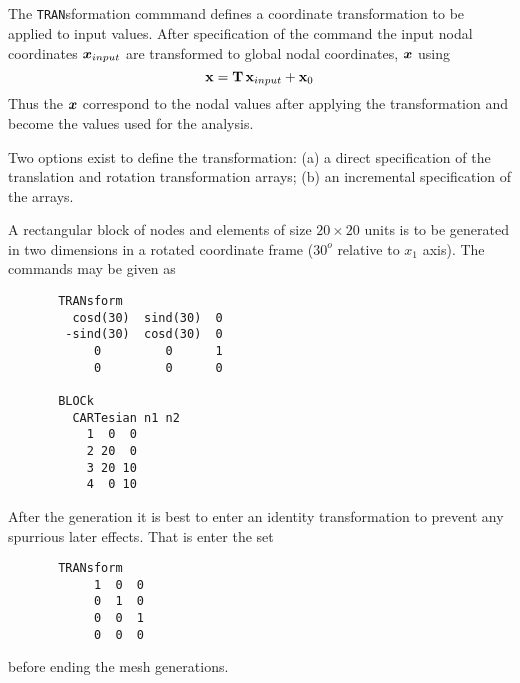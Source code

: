  \\{\smallskip}
 \\{\smallskip}
 \\{\smallskip}
 \\{\smallskip}
\headb

The {\tt TRAN}sformation commmand defines a coordinate transformation
to be applied to input values. After specification of the command
the input nodal coordinates $\boldsymbol{x}_{input}$ are transformed to global
nodal coordinates, $\boldsymbol{x}$ using
\begin{displaymath}
\mathbf{x} = \mathbf{T} \, \mathbf{x}_{input} + \mathbf{x}_0
\end{displaymath}
Thus the $\boldsymbol{x}$ correspond to the nodal values after applying
the transformation and become the values used for the analysis.

Two options exist to define the transformation: (a) a direct specification of
the translation and rotation transformation arrays; (b) an incremental
specification of the arrays. 


A rectangular block of nodes and elements of size $20 \times 20$ units
is to be generated in two dimensions
in a rotated coordinate frame ($30^o$ relative to $x_1$ axis).  The commands
may be given as
\begin{verbatim}
       TRANsform
         cosd(30)  sind(30)  0
        -sind(30)  cosd(30)  0
            0         0      1
            0         0      0

       BLOCk
         CARTesian n1 n2
           1  0  0
           2 20  0
           3 20 10
           4  0 10
\end{verbatim}
After the generation it is best to enter an identity transformation 
to prevent any spurrious later effects.  That is enter the set
\begin{verbatim}
       TRANsform
            1  0  0
            0  1  0
            0  0  1
            0  0  0
\end{verbatim}
before ending the mesh generations.

